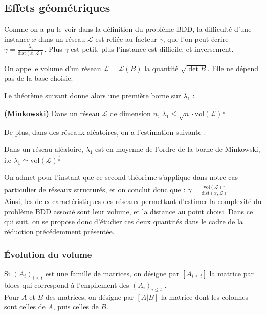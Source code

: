 \documentclass[11pt,a4paper]{article}
\begin{document}
\subsection{Effets géométriques}

Comme on a pu le voir dans la définition du problème BDD, la difficulté d'une instance $x$ dans un réseau $\mathcal{L}$ est reliée au facteur $\gamma$, que l'on peut écrire $\gamma = \frac{\lambda_1}{\text{dist}(x,\mathcal{L})}$. Plus $\gamma$ est petit, plus l'instance est difficile, et inversement. 

\begin{defin}
On appelle volume d'un réseau $\mathcal{L}=\mathcal{L}(B)$ la quantité $\sqrt{\det{B}}$. Elle ne dépend pas de la base choisie.
\end{defin}

Le théorème suivant donne alors une première borne sur $\lambda_1$ :
\begin{theorem}\textbf{(Minkowski)}
Dans un réseau $\mathcal{L}$ de dimension $n$, $\lambda_1 \leq \sqrt{n}\cdot\text{vol}(\mathcal{L})^\frac{1}{n}$
\end{theorem}

De plus, dans des réseaux aléatoires, on a l'estimation suivante : 
\begin{theorem}
Dans un réseau aléatoire, $\lambda_1$ est en moyenne de l'ordre de la borne de Minkowski, i.e $\lambda_1 \simeq \text{vol}(\mathcal{L})^\frac{1}{n}$
\end{theorem}

On admet pour l'instant que ce second théorème s'applique dans notre cas particulier de réseaux structurés, et on conclut donc que : $\gamma = \frac{\text{vol}(\mathcal{L})^\frac{1}{n}}{\text{dist}(x,\mathcal{L})}$. \\

Ainsi, les deux caractéristiques des réseaux permettant d'estimer la complexité du problème BDD associé sont leur volume, et la distance au point choisi.  Dans ce qui suit, on se propose donc d'étudier ces deux quantités dans le cadre de la réduction précédemment présentée.

\subsubsection{Évolution du volume }
Si $(A_i)_{i \leq t}$ est une famille de matrices, on désigne par $[A_{i\leq t}]$ la matrice par blocs qui correspond à l'empilement des  $(A_i)_{i \leq t}$ . \\
Pour $A$ et $B$ des matrices, on désigne par $[A|B]$ la matrice dont les colonnes sont celles de $A$, puis celles de $B$. \\
\end{document}
